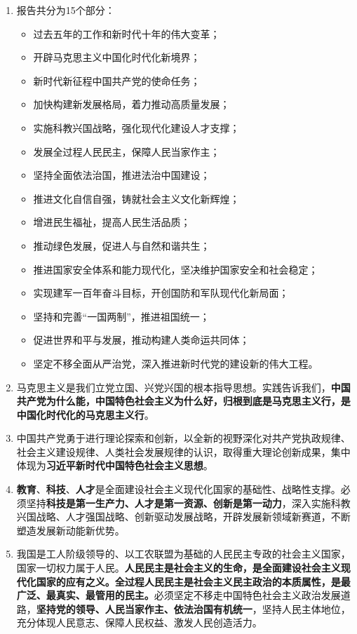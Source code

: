 \documentclass[UTF8,11pt,a4paper]{ctexart}
\begin{document}
\begin{enumerate}[label=\arabic*., leftmargin=2.3em]
\item 报告共分为15个部分：
\begin{itemize}[leftmargin=2.2em]
\item 过去五年的工作和新时代十年的伟大变革；
\item 开辟马克思主义中国化时代化新境界；
\item 新时代新征程中国共产党的使命任务；
\item 加快构建新发展格局，着力推动高质量发展；
\item 实施科教兴国战略，强化现代化建设人才支撑；
\item 发展全过程人民民主，保障人民当家作主；
\item 坚持全面依法治国，推进法治中国建设；
\item 推进文化自信自强，铸就社会主义文化新辉煌；
\item 增进民生福祉，提高人民生活品质；
\item 推动绿色发展，促进人与自然和谐共生；
\item 推进国家安全体系和能力现代化，坚决维护国家安全和社会稳定；
\item 实现建军一百年奋斗目标，开创国防和军队现代化新局面；
\item 坚持和完善“一国两制”，推进祖国统一；
\item 促进世界和平与发展，推动构建人类命运共同体；
\item 坚定不移全面从严治党，深入推进新时代党的建设新的伟大工程。
\end{itemize}
\item 马克思主义是我们立党立国、兴党兴国的根本指导思想。实践告诉我们，\textbf{中国共产党为什么能，中国特色社会主义为什么好，归根到底是马克思主义行，是中国化时代化的马克思主义行}。
\item 中国共产党勇于进行理论探索和创新，以全新的视野深化对共产党执政规律、社会主义建设规律、人类社会发展规律的认识，取得重大理论创新成果，集中体现为\textbf{习近平新时代中国特色社会主义思想}。
\item \textbf{教育}、\textbf{科技}、\textbf{人才}是全面建设社会主义现代化国家的基础性、战略性支撑。必须坚持\textbf{科技是第一生产力、人才是第一资源、创新是第一动力}，深入实施科教兴国战略、人才强国战略、创新驱动发展战略，开辟发展新领域新赛道，不断塑造发展新动能新优势。
\item 我国是工人阶级领导的、以工农联盟为基础的人民民主专政的社会主义国家，国家一切权力属于人民。\textbf{人民民主是社会主义的生命，是全面建设社会主义现代化国家的应有之义。全过程人民民主是社会主义民主政治的本质属性，是最广泛、最真实、最管用的民主。}必须坚定不移走中国特色社会主义政治发展道路，\textbf{坚持党的领导、人民当家作主、依法治国有机统一}，坚持人民主体地位，充分体现人民意志、保障人民权益、激发人民创造活力。

\end{enumerate}
\end{document}
